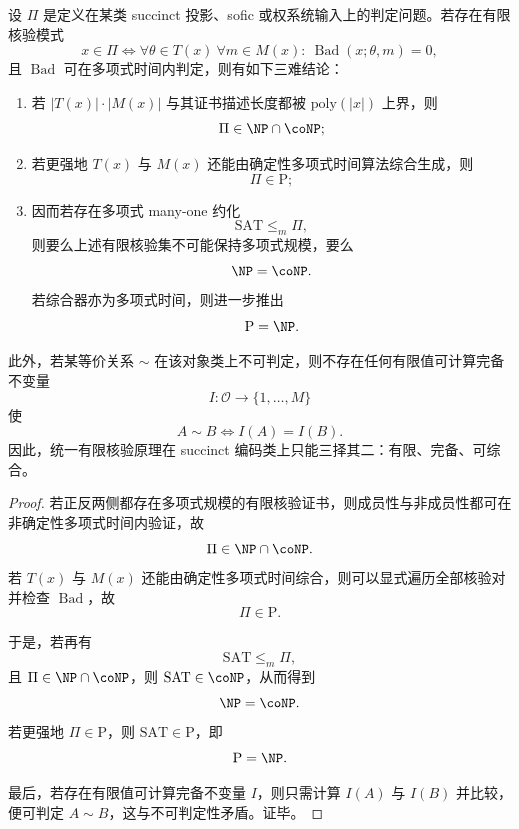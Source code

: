 \begin{theorem}[有限核验闭包的复杂性三难]\label{thm:conclusion-finite-verification-closure-complexity-trilemma}
设 \(\Pi\) 是定义在某类 succinct 投影、sofic 或权系统输入上的判定问题。若存在有限核验模式
\[
x\in \Pi
\iff
\forall \theta\in T(x)\ \forall m\in M(x):\ \operatorname{Bad}(x;\theta,m)=0,
\]
且 \(\operatorname{Bad}\) 可在多项式时间内判定，则有如下三难结论：
\begin{enumerate}
  \item 若 \(|T(x)|\cdot |M(x)|\) 与其证书描述长度都被 \(\mathrm{poly}(|x|)\) 上界，则
  \[
  \Pi\in \NP\cap \coNP;
  \]
  \item 若更强地 \(T(x)\) 与 \(M(x)\) 还能由确定性多项式时间算法综合生成，则
  \[
  \Pi\in \mathrm P;
  \]
  \item 因而若存在多项式 many-one 约化
  \[
  \mathrm{SAT}\le_m \Pi,
  \]
  则要么上述有限核验集不可能保持多项式规模，要么
  \[
  \NP=\coNP.
  \]
  若综合器亦为多项式时间，则进一步推出
  \[
  \mathrm P=\NP.
  \]
\end{enumerate}
此外，若某等价关系 \(\sim\) 在该对象类上不可判定，则不存在任何有限值可计算完备不变量
\[
I:\mathcal O\to\{1,\dots,M\}
\]
使
\[
A\sim B\iff I(A)=I(B).
\]
因此，统一有限核验原理在 succinct 编码类上只能三择其二：有限、完备、可综合。
\end{theorem}
\begin{proof}
若正反两侧都存在多项式规模的有限核验证书，则成员性与非成员性都可在非确定性多项式时间内验证，故
\[
\Pi\in \NP\cap \coNP.
\]
若 \(T(x)\) 与 \(M(x)\) 还能由确定性多项式时间综合，则可以显式遍历全部核验对并检查 \(\operatorname{Bad}\)，故
\[
\Pi\in \mathrm P.
\]

于是，若再有
\[
\mathrm{SAT}\le_m \Pi,
\]
且 \(\Pi\in \NP\cap \coNP\)，则 \(\mathrm{SAT}\in \coNP\)，从而得到
\[
\NP=\coNP.
\]
若更强地 \(\Pi\in \mathrm P\)，则 \(\mathrm{SAT}\in \mathrm P\)，即
\[
\mathrm P=\NP.
\]

最后，若存在有限值可计算完备不变量 \(I\)，则只需计算 \(I(A)\) 与 \(I(B)\) 并比较，便可判定 \(A\sim B\)，这与不可判定性矛盾。证毕。
\end{proof}

